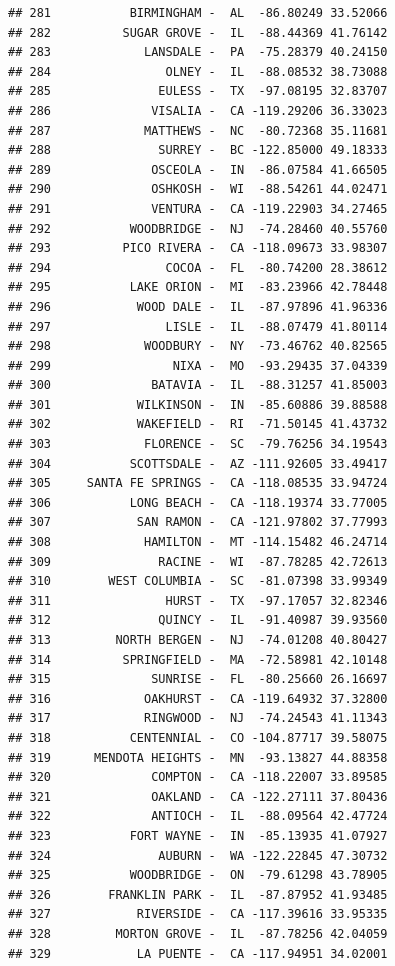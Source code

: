 \documentclass{article}\usepackage[]{graphicx}\usepackage[]{color}
\makeatletter
\newenvironment{kframe}{%
 \def\at@end@of@kframe{}%
 \ifinner\ifhmode%
  \def\at@end@of@kframe{\end{minipage}}%
  \begin{minipage}{\columnwidth}%
 \fi\fi%
 \def\FrameCommand##1{\hskip\@totalleftmargin \hskip-\fboxsep
 \colorbox{shadecolor}{##1}\hskip-\fboxsep
     \hskip-\linewidth \hskip-\@totalleftmargin \hskip\columnwidth}%
 \MakeFramed {\advance\hsize-\width
   \@totalleftmargin\z@ \linewidth\hsize
   \@setminipage}}%
 {\par\unskip\endMakeFramed%
 \at@end@of@kframe}
\newenvironment{knitrout}{}{} %
\makeatother
\begin{document}
\begin{knitrout}
\begin{kframe}
\begin{verbatim}
## 281           BIRMINGHAM -  AL  -86.80249 33.52066
## 282          SUGAR GROVE -  IL  -88.44369 41.76142
## 283             LANSDALE -  PA  -75.28379 40.24150
## 284                OLNEY -  IL  -88.08532 38.73088
## 285               EULESS -  TX  -97.08195 32.83707
## 286              VISALIA -  CA -119.29206 36.33023
## 287             MATTHEWS -  NC  -80.72368 35.11681
## 288               SURREY -  BC -122.85000 49.18333
## 289              OSCEOLA -  IN  -86.07584 41.66505
## 290              OSHKOSH -  WI  -88.54261 44.02471
## 291              VENTURA -  CA -119.22903 34.27465
## 292           WOODBRIDGE -  NJ  -74.28460 40.55760
## 293          PICO RIVERA -  CA -118.09673 33.98307
## 294                COCOA -  FL  -80.74200 28.38612
## 295           LAKE ORION -  MI  -83.23966 42.78448
## 296            WOOD DALE -  IL  -87.97896 41.96336
## 297                LISLE -  IL  -88.07479 41.80114
## 298             WOODBURY -  NY  -73.46762 40.82565
## 299                 NIXA -  MO  -93.29435 37.04339
## 300              BATAVIA -  IL  -88.31257 41.85003
## 301            WILKINSON -  IN  -85.60886 39.88588
## 302            WAKEFIELD -  RI  -71.50145 41.43732
## 303             FLORENCE -  SC  -79.76256 34.19543
## 304           SCOTTSDALE -  AZ -111.92605 33.49417
## 305     SANTA FE SPRINGS -  CA -118.08535 33.94724
## 306           LONG BEACH -  CA -118.19374 33.77005
## 307            SAN RAMON -  CA -121.97802 37.77993
## 308             HAMILTON -  MT -114.15482 46.24714
## 309               RACINE -  WI  -87.78285 42.72613
## 310        WEST COLUMBIA -  SC  -81.07398 33.99349
## 311                HURST -  TX  -97.17057 32.82346
## 312               QUINCY -  IL  -91.40987 39.93560
## 313         NORTH BERGEN -  NJ  -74.01208 40.80427
## 314          SPRINGFIELD -  MA  -72.58981 42.10148
## 315              SUNRISE -  FL  -80.25660 26.16697
## 316             OAKHURST -  CA -119.64932 37.32800
## 317             RINGWOOD -  NJ  -74.24543 41.11343
## 318           CENTENNIAL -  CO -104.87717 39.58075
## 319      MENDOTA HEIGHTS -  MN  -93.13827 44.88358
## 320              COMPTON -  CA -118.22007 33.89585
## 321              OAKLAND -  CA -122.27111 37.80436
## 322              ANTIOCH -  IL  -88.09564 42.47724
## 323           FORT WAYNE -  IN  -85.13935 41.07927
## 324               AUBURN -  WA -122.22845 47.30732
## 325           WOODBRIDGE -  ON  -79.61298 43.78905
## 326        FRANKLIN PARK -  IL  -87.87952 41.93485
## 327            RIVERSIDE -  CA -117.39616 33.95335
## 328         MORTON GROVE -  IL  -87.78256 42.04059
## 329            LA PUENTE -  CA -117.94951 34.02001

\end{verbatim}
\end{kframe}
\end{knitrout}
\end{document}
